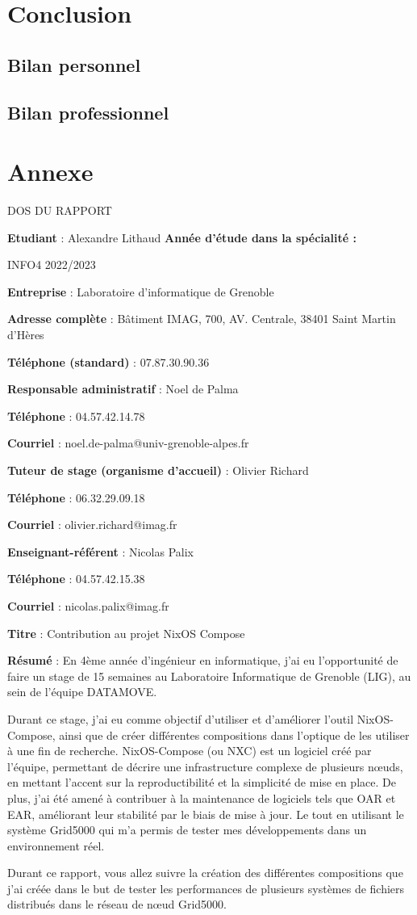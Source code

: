 \documentclass[a4paper,french,12pt, titlepage]{article}
\makeatletter
\newcommand{\makefooter}{%
  \makefooterhooka
}
\newcommand{\makefooterhooka}{%
    \begin{center}
        \begin{Large}
        DOS DU RAPPORT
        \end{Large}
    \end{center}
    
    
    \textbf{Etudiant} : Alexandre Lithaud
    \hfill \textbf{Année d’étude dans la spécialité :}
    
    \hfill INFO4 2022/2023
    
    \hfill
    
    \textbf{Entreprise} : Laboratoire d'informatique de Grenoble 

    \textbf{Adresse complète} : Bâtiment IMAG, 700, AV. Centrale, 38401
Saint Martin d'Hères

    \textbf{Téléphone (standard)} : 07.87.30.90.36
    
    \hfill
    
    \textbf{Responsable administratif} : Noel de Palma 

    \textbf{Téléphone} : 04.57.42.14.78

    \textbf{Courriel} : noel.de-palma@univ-grenoble-alpes.fr

    \hfill
    
    \textbf{Tuteur de stage (organisme d’accueil)} : Olivier Richard

    \textbf{Téléphone} : 06.32.29.09.18

    \textbf{Courriel} : olivier.richard@imag.fr
    
    \hfill
    
    \textbf{Enseignant-référent} : Nicolas Palix

    \textbf{Téléphone} : 04.57.42.15.38 

    \textbf{Courriel} : nicolas.palix@imag.fr 

    \hfill
    
    \textbf{Titre} : Contribution au projet NixOS Compose
    
    \hfill

    \textbf{Résumé} : En 4ème année d'ingénieur en informatique, j'ai eu
l'opportunité de faire un stage de 15 semaines au Laboratoire
Informatique de Grenoble (LIG), au sein de l'équipe DATAMOVE.\newline

Durant ce stage, j'ai eu comme objectif d'utiliser et d'améliorer
l'outil NixOS-Compose, ainsi que de créer différentes compositions dans
l'optique de les utiliser à une fin de recherche. NixOS-Compose (ou NXC)
est un logiciel créé par l'équipe, permettant de décrire une
infrastructure complexe de plusieurs nœuds, en mettant l'accent sur la
reproductibilité et la simplicité de mise en place. De plus, j'ai été
amené à contribuer à la maintenance de logiciels tels que OAR et EAR,
améliorant leur stabilité par le biais de mise à jour. Le tout en
utilisant le système Grid5000 qui m'a permis de tester mes
développements dans un environnement réel.\newline

Durant ce rapport, vous allez suivre la création des différentes
compositions que j'ai créée dans le but de tester les performances de
plusieurs systèmes de fichiers distribués dans le réseau de nœud
Grid5000.
}
\makeatother
\begin{document}
\newpage

\hypertarget{conclusion}{%
\section{Conclusion}\label{conclusion}}

\hypertarget{bilan-personnel}{%
\subsection{Bilan personnel}\label{bilan-personnel}}

\hypertarget{bilan-professionnel}{%
\subsection{Bilan professionnel}\label{bilan-professionnel}}

\newpage

\hypertarget{annexe}{%
\section{Annexe}\label{annexe}}

\printbibliography

\printglossaries

\begin{titlingpage}
\newpage
\makefooter
\end{titlingpage}
\end{document}
